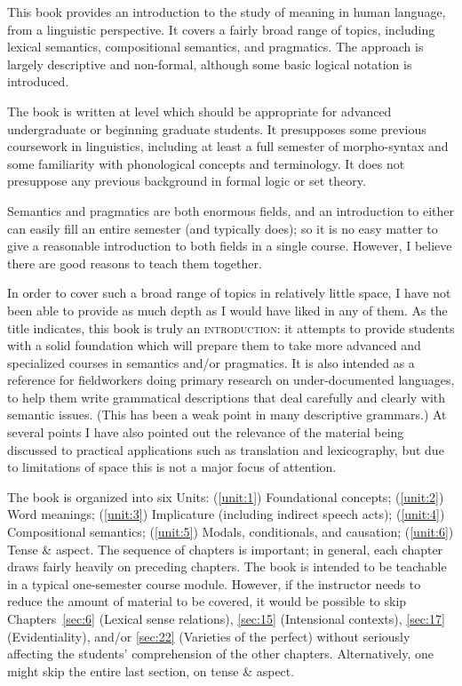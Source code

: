 \begin{refsection}

This book provides an introduction to the study of meaning in human language, from a linguistic perspective. It covers a fairly broad range of topics, including lexical semantics, compositional semantics, and pragmatics. The approach is largely descriptive and non-formal, although some basic logical notation is introduced.


The book is written at level which should be appropriate for advanced undergraduate or beginning graduate students. It presupposes some previous coursework in linguistics, including at least a full semester of morpho-syntax and some familiarity with phonological concepts and terminology. It does not presuppose any previous background in formal logic or set theory.



Semantics and pragmatics are both enormous fields, and an introduction to either can easily fill an entire semester (and typically does); so it is no easy matter to give a reasonable introduction to both fields in a single course. However, I believe there are good reasons to teach them together.



In order to cover such a broad range of topics in relatively little space, I have not been able to provide as much depth as I would have liked in any of them. As the title indicates, this book is truly an \textsc{introduction}: it attempts to provide students with a solid foundation which will prepare them to take more advanced and specialized courses in semantics and/or pragmatics. It is also intended as a reference for fieldworkers doing primary research on under-documented languages, to help them write grammatical descriptions that deal carefully and clearly with semantic issues. (This has been a weak point in many descriptive grammars.) At several points I have also pointed out the relevance of the material being discussed to practical applications such as translation and lexicography, but due to limitations of space this is not a major focus of attention.



The book is organized into six Units: (\ref{unit:1}) Foundational concepts; (\ref{unit:2}) Word meanings; (\ref{unit:3}) Implicature (including indirect speech acts); (\ref{unit:4}) Compositional semantics; (\ref{unit:5}) Modals, conditionals, and causation; (\ref{unit:6}) Tense \& aspect. The sequence of chapters is important; in general, each chapter draws fairly heavily on preceding chapters. The book is intended to be teachable in a typical one-semester course module. However, if the instructor needs to reduce the amount of material to be covered, it would be possible to skip Chapters~\ref{sec:6} (Lexical sense relations), \ref{sec:15} (Intensional contexts), \ref{sec:17} (Evidentiality), and\slash or \ref{sec:22} (Varieties of the perfect) without seriously affecting the students’ comprehension of the other chapters. Alternatively, one might skip the entire last section, on tense \& aspect.




\end{refsection}
